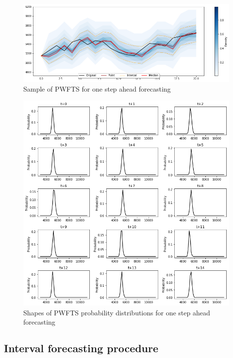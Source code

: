 \begin{figure}[htb]
    \centering
    \includegraphics[width=\textwidth]{figures/pwfts_sample_onestep.png}
    \caption{Sample of PWFTS for one step ahead forecasting}
    \label{fig:pwfts_sample_onestep}
\end{figure}

\begin{figure}[htb]
    \centering
    \includegraphics[width=\textwidth]{figures/pwfts_sample_onestep_tiled.png}
    \caption{Shapes of PWFTS probability distributions for one step ahead forecasting}
    \label{fig:pwfts_sample_onestep_tiled}
\end{figure}

\subsection{Interval forecasting procedure}
\label{sec:pwfts_interval}

